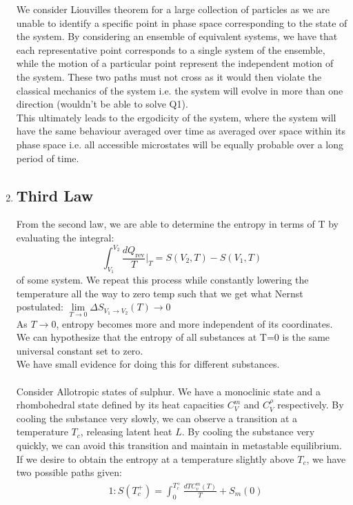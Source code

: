 \documentclass[12pt,a4paper]{article}
\begin{document}
\begin{enumerate}
    We consider Liouvilles theorem for a large collection of particles as we are unable to identify a specific point in phase space corresponding to the state of the system. By considering an ensemble of equivalent systems, we have that each representative point corresponds to a single system of the ensemble, while the motion of a particular point represent the independent motion of the system. These two paths must not cross as it would then violate the classical mechanics of the system i.e. the system will evolve in more than one direction (wouldn't be able to solve Q1).\\
    This ultimately leads to the ergodicity of the system, where the system will have the same behaviour averaged over time as averaged over space within its phase space i.e. all accessible microstates will be equally probable over a long period of time.
    \setcounter{enumi}{4}
    \newpage
    \item \subsection*{Third Law}
    From the second law, we are able to determine the entropy in terms of T by evaluating the integral:
    \[\int_{V_1}^{V_2}\frac{dQ_{\text{rev}}}{T}\bigg|_T = S(V_2,T) - S(V_1,T)\]
    of some system. We repeat this process while constantly lowering the temperature all the way to zero temp such that we get what Nernst postulated: $\lim\limits_{T\rightarrow 0}\Delta S_{V_1\rightarrow V_2}(T) \rightarrow 0$\\
    As $T\rightarrow0$, entropy becomes more and more independent of its coordinates. We can hypothesize that the entropy of all substances at T=0 is the same universal constant set to zero.\\
    We have small evidence for doing this for different substances.\\
    \\
    Consider Allotropic states of sulphur. We have a monoclinic state and a rhombohedral state defined by its heat capacities $C_V^m$ and $C_V^{\rho}$ respectively. By cooling the substance very slowly, we can observe a transition at a temperature $T_c$, releasing latent heat $L$. By cooling the substance very quickly, we can avoid this transition and maintain in metastable equilibrium. If we desire to obtain the entropy at a temperature slightly above $T_c$, we have two possible paths given:
    \begin{align*}
    &1: S(T_c^{+}) = \int_{0}^{T_c^{+}}\frac{dTC_v^{m}(T)}{T} + S_m(0)\\

\end{align*}
\end{enumerate}
\end{document}
